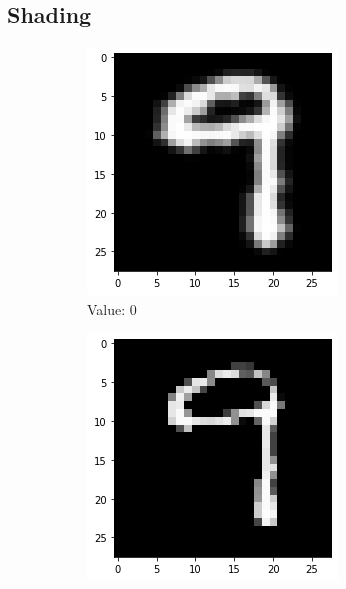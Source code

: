 \subsection{Shading}
    \begin{figure}[htb!]
        \centering
        \begin{subfigure}[b]{.3\textwidth}
            \centering
            \includegraphics[width=\linewidth]{images/shade1.png}
            \caption{Value: 0}
            \label{fig:Rotate-misclass0}
        \end{subfigure}%
        \begin{subfigure}[b]{.3\textwidth}
            \centering
            \includegraphics[width=\textwidth]{images/shade2.png}

\end{subfigure}
\end{figure}
